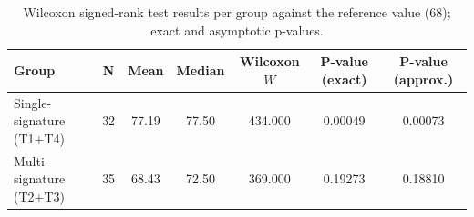 \begin{table}[tbp]
\centering
\begin{tabular}{lcccccc}
\toprule
Group & N & Mean & Median & Wilcoxon $W$ & P-value (exact) & P-value (approx.) \\ \midrule
Single-signature (T1+T4) & 32 & 77.19 & 77.50 & 434.000 & 0.00049 & 0.00073 \\
Multi-signature (T2+T3) & 35 & 68.43 & 72.50 & 369.000 & 0.19273 & 0.18810 \\
\bottomrule
\end{tabular}
\caption{Wilcoxon signed-rank test results per group against the reference value (68); exact and asymptotic p-values.}
\label{tab:wilcoxon_group_results}
\end{table}
